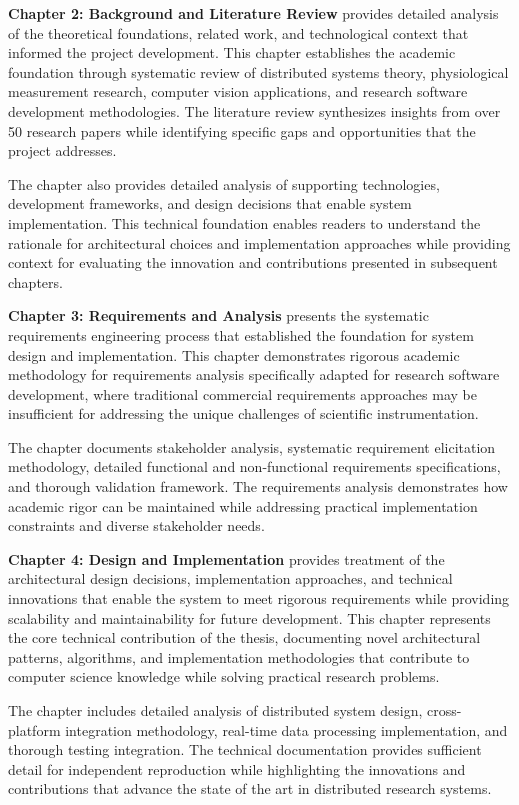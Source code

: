 \documentclass[11pt,a4paper]{article}
\begin{document}
\textbf{Chapter 2: Background and Literature Review} provides detailed analysis of the theoretical foundations, related
work, and technological context that informed the project development.  This chapter
establishes the academic foundation
through systematic review of distributed systems theory, physiological measurement
research, computer vision
applications, and research software development methodologies.  The literature review
synthesizes insights from over 50
research papers while identifying specific gaps and opportunities that the project
addresses.

The chapter also provides detailed analysis of supporting technologies, development
frameworks, and design decisions
that enable system implementation.  This technical foundation enables readers to
understand the rationale for
architectural choices and implementation approaches while providing context for
evaluating the innovation and
contributions presented in subsequent chapters.

\textbf{Chapter 3: Requirements and Analysis} presents the systematic requirements engineering process that established the
foundation for system design and implementation.  This chapter demonstrates rigorous
academic methodology for
requirements analysis specifically adapted for research software development, where
traditional commercial requirements
approaches may be insufficient for addressing the unique challenges of scientific
instrumentation.

The chapter documents stakeholder analysis, systematic requirement
elicitation methodology, detailed
functional and non-functional requirements specifications, and thorough validation
framework.  The requirements
analysis demonstrates how academic rigor can be maintained while addressing practical
implementation constraints and
diverse stakeholder needs.

\textbf{Chapter 4: Design and Implementation} provides treatment of the architectural design decisions,
implementation approaches, and technical innovations that enable the system to meet
rigorous requirements while
providing scalability and maintainability for future development.  This chapter
represents the core technical
contribution of the thesis, documenting novel architectural patterns,
algorithms, and implementation
methodologies that contribute to computer science knowledge while solving practical
research problems.

The chapter includes detailed analysis of distributed system design, cross-platform
integration methodology, real-time
data processing implementation, and thorough testing integration.  The technical
documentation provides sufficient
detail for independent reproduction while highlighting the innovations and
contributions that advance the state of the
art in distributed research systems.
\end{document}
